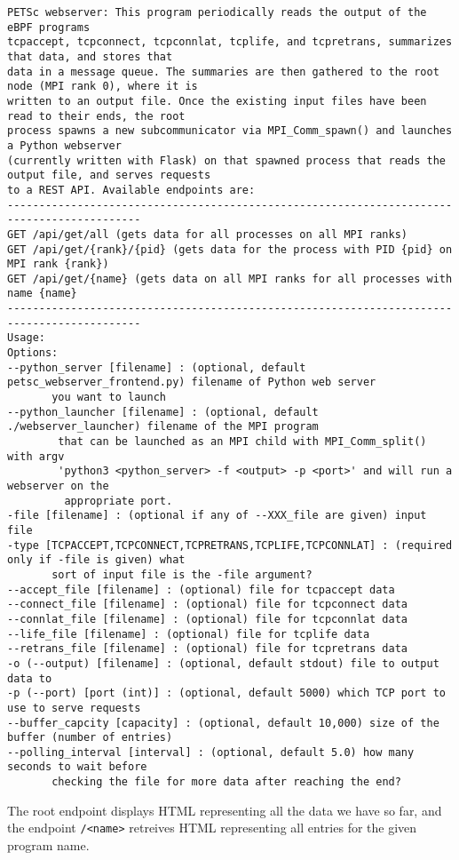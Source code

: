 \documentclass[11pt]{article}
\begin{document}
\begin{Verbatim}[xleftmargin=-3cm]
PETSc webserver: This program periodically reads the output of the eBPF programs
tcpaccept, tcpconnect, tcpconnlat, tcplife, and tcpretrans, summarizes that data, and stores that
data in a message queue. The summaries are then gathered to the root node (MPI rank 0), where it is
written to an output file. Once the existing input files have been read to their ends, the root
process spawns a new subcommunicator via MPI_Comm_spawn() and launches a Python webserver
(currently written with Flask) on that spawned process that reads the output file, and serves requests
to a REST API. Available endpoints are:
-------------------------------------------------------------------------------------------
GET /api/get/all (gets data for all processes on all MPI ranks)
GET /api/get/{rank}/{pid} (gets data for the process with PID {pid} on MPI rank {rank})
GET /api/get/{name} (gets data on all MPI ranks for all processes with name {name}
-------------------------------------------------------------------------------------------
Usage:
Options:
--python_server [filename] : (optional, default petsc_webserver_frontend.py) filename of Python web server
       you want to launch
--python_launcher [filename] : (optional, default ./webserver_launcher) filename of the MPI program
        that can be launched as an MPI child with MPI_Comm_split() with argv
        'python3 <python_server> -f <output> -p <port>' and will run a webserver on the
         appropriate port.
-file [filename] : (optional if any of --XXX_file are given) input file
-type [TCPACCEPT,TCPCONNECT,TCPRETRANS,TCPLIFE,TCPCONNLAT] : (required only if -file is given) what
       sort of input file is the -file argument?
--accept_file [filename] : (optional) file for tcpaccept data
--connect_file [filename] : (optional) file for tcpconnect data
--connlat_file [filename] : (optional) file for tcpconnlat data
--life_file [filename] : (optional) file for tcplife data
--retrans_file [filename] : (optional) file for tcpretrans data
-o (--output) [filename] : (optional, default stdout) file to output data to
-p (--port) [port (int)] : (optional, default 5000) which TCP port to use to serve requests
--buffer_capcity [capacity] : (optional, default 10,000) size of the buffer (number of entries)
--polling_interval [interval] : (optional, default 5.0) how many seconds to wait before
       checking the file for more data after reaching the end?
\end{Verbatim}
The root endpoint displays HTML representing all the data we have so far, and the endpoint \lstinline{/<name>} retreives HTML representing all entries for the given program name.
\end{document}

